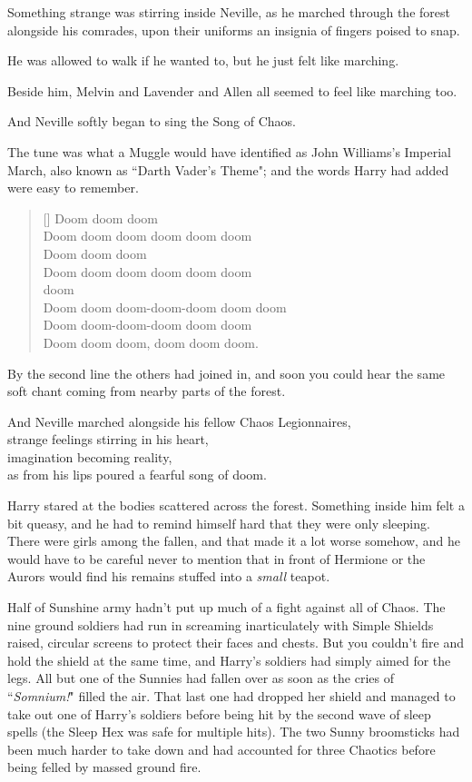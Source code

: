 Something strange was stirring inside Neville, as he marched through the forest alongside his comrades, upon their uniforms an insignia of fingers poised to snap.

He was allowed to walk if he wanted to, but he just felt like marching.

Beside him, Melvin and Lavender and Allen all seemed to feel like marching too.

And Neville softly began to sing the Song of Chaos.

The tune was what a Muggle would have identified as John Williams's Imperial March, also known as ``Darth Vader's Theme"; and the words Harry had added were easy to remember.

\baselineskip\settowidth{\versewidth}{Doom doom doom-doom-doom doom doom}
\begin{verse}[\versewidth]
Doom doom doom\\
Doom doom doom doom doom doom\\
Doom doom doom\\
Doom doom doom doom doom doom\\
 doom \\
Doom doom doom-doom-doom doom doom\\
Doom doom-doom-doom doom doom\\
Doom doom doom, doom doom doom.
\end{verse}\baselineskip

By the second line the others had joined in, and soon you could hear the same soft chant coming from nearby parts of the forest.

And Neville marched alongside his fellow Chaos Legionnaires,\\
strange feelings stirring in his heart,\\
imagination becoming reality,\\
as from his lips poured a fearful song of doom.

\later

Harry stared at the bodies scattered across the forest. Something inside him felt a bit queasy, and he had to remind himself hard that they were only sleeping. There were girls among the fallen, and that made it a lot worse somehow, and he would have to be careful never to mention that in front of Hermione or the Aurors would find his remains stuffed into a \emph{small} teapot.

Half of Sunshine army hadn't put up much of a fight against all of Chaos. The nine ground soldiers had run in screaming inarticulately with Simple Shields raised, circular screens to protect their faces and chests. But you couldn't fire and hold the shield at the same time, and Harry's soldiers had simply aimed for the legs. All but one of the Sunnies had fallen over as soon as the cries of ``\emph{Somnium!}" filled the air. That last one had dropped her shield and managed to take out one of Harry's soldiers before being hit by the second wave of sleep spells (the Sleep Hex was safe for multiple hits). The two Sunny broomsticks had been much harder to take down and had accounted for three Chaotics before being felled by massed ground fire.

